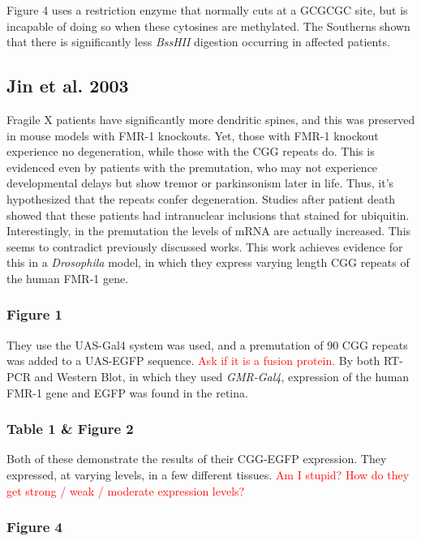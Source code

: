 \documentclass[12pt]{report}
\begin{document}
Figure 4 uses a restriction enzyme that normally cuts at a GCGCGC site, but is incapable of doing so when these cytosines are methylated. The Southerns shown that there is significantly less \textit{BssHII} digestion occurring in affected patients. 

\subsection{Jin et al. 2003}

Fragile X patients have significantly more dendritic spines, and this was preserved in mouse models with FMR-1 knockouts. Yet, those with FMR-1 knockout experience no degeneration, while those with the CGG repeats do. This is evidenced even by patients with the premutation, who may not experience developmental delays but show tremor or parkinsonism later in life. Thus, it's hypothesized that the repeats confer degeneration. Studies after patient death showed that these patients had intranuclear inclusions that stained for ubiquitin. Interestingly, in the premutation the levels of mRNA are actually increased. This seems to contradict previously discussed works. This work achieves evidence for this in a \textit{Drosophila} model, in which they express varying length CGG repeats of the human FMR-1 gene.

\subsubsection{Figure 1}
They use the UAS-Gal4 system was used, and a premutation of 90 CGG repeats was added to a UAS-EGFP sequence. \textcolor{red}{Ask if it is a fusion protein.} By both RT-PCR and Western Blot, in which they used \textit{GMR-Gal4}, expression of the human FMR-1 gene and EGFP was found in the retina. 

\subsubsection{Table 1 \& Figure 2}

Both of these demonstrate the results of their CGG-EGFP expression. They expressed, at varying levels, in a few different tissues. \textcolor{red}{Am I stupid? How do they get strong / weak / moderate expression levels?} 

\subsubsection{Figure 4}
\end{document}

